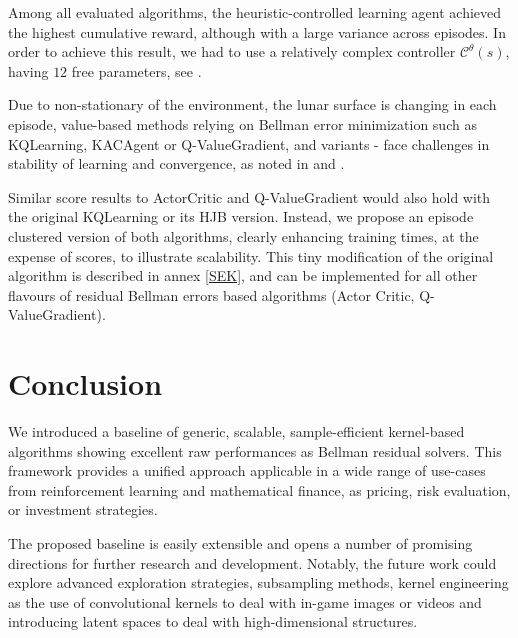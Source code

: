 \documentclass[
]{article}
\numberwithin{equation}{section}
\begin{document}
Among all evaluated algorithms, the heuristic-controlled learning agent achieved the highest cumulative reward, although with a large variance across episodes.  In order to achieve this result, we had to use a relatively complex controller $\mathcal{C}^{\theta}(s)$, having $12$ free parameters, see \cite{HeuristicLunar}. 


Due to non-stationary of the environment, the lunar surface is changing in each episode, value-based methods relying on Bellman error minimization such as KQLearning, KACAgent or Q-ValueGradient, and variants - face challenges in stability of learning and convergence, as noted in \cite{FuMePrNaSh} and \cite{sutton2018}. 

Similar score results to ActorCritic and Q-ValueGradient would also hold with the original KQLearning or its HJB version. Instead, we propose an episode clustered version of both algorithms, clearly enhancing training times, at the expense of scores, to illustrate scalability. This tiny modification of the original algorithm is described in annex \ref{SEK}, and can be implemented for all other flavours of residual Bellman errors based algorithms (Actor Critic, Q-ValueGradient).

\hypertarget{Conclusion}{%
\section{Conclusion}\label{Conclusion}}

We introduced a baseline of generic, scalable, sample-efficient kernel-based algorithms showing excellent raw performances as Bellman residual solvers. This framework provides a unified approach applicable in a wide range of use-cases from reinforcement learning and mathematical finance, as pricing, risk evaluation, or investment strategies.

The proposed baseline is easily extensible and opens a number of promising directions for further research and development. Notably, the future work could explore advanced exploration strategies, subsampling methods, kernel engineering as the use of convolutional kernels to deal with in-game images or videos and introducing latent spaces to deal with high-dimensional structures.

\newpage
\end{document}
